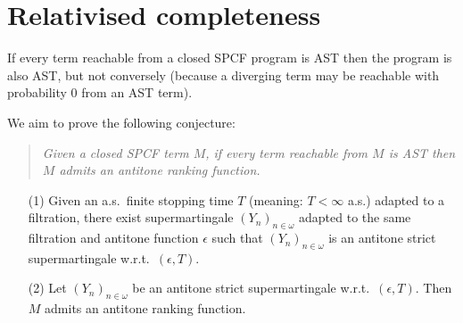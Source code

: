 
\section{Relativised completeness}
\label{sec:Relativised completeness}

If every term reachable from a closed SPCF program is AST then the program is also AST, but not conversely 
(because a diverging term may be reachable with probability 0 from an AST term).

We aim to prove the following conjecture:

\begin{quote}
\emph{Given a closed SPCF term $M$, if every term reachable from $M$ is AST then $M$ admits an antitone ranking function.}
\end{quote}

\begin{enumerate}

\item[(1)] Given an a.s.~finite stopping time $T$ (meaning: $T < \infty$ a.s.) adapted to a filtration, there exist supermartingale $(Y_n)_{n \in \omega}$ adapted to the same filtration and antitone function $\epsilon$ such that $(Y_n)_{n \in \omega}$ is an antitone strict supermartingale w.r.t.~$(\epsilon, T)$.

\item[(2)] Let $(Y_n)_{n \in \omega}$ be an antitone strict supermartingale w.r.t.~$(\epsilon, T)$. 
Then $M$ admits an antitone ranking function.
\end{enumerate}


\iffalse
For (2), note that for every $N \in \mathit{Rch}(M)$, there exists $n \geq 0$ and $s \in S$ such that $\red^n(M, s) = (N, -)$.
Define a function $f : \mathit{Rch}(M) \to \nnReal$ by $f(N) := Y_n'(s)$.
\fi

